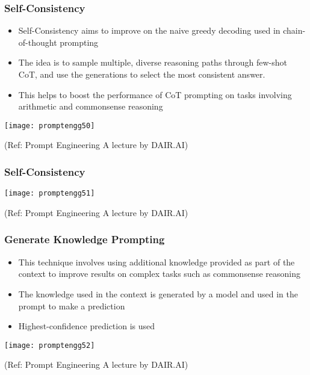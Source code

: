 \begin{frame}[fragile]\frametitle{Self-Consistency}

\begin{itemize}
\item Self-Consistency aims to improve on the naive greedy 
decoding used in chain-of-thought prompting 
\item The idea is to sample multiple, diverse reasoning paths 
through few-shot CoT, and use the generations to select 
the most consistent answer.  
\item  This helps to boost the performance of CoT prompting on 
tasks involving arithmetic and commonsense reasoning
\end{itemize}	

\begin{center}
\texttt{[image: promptengg50]}

{\tiny (Ref: Prompt Engineering A lecture by DAIR.AI)}

\end{center}	

\end{frame}


\begin{frame}[fragile]\frametitle{Self-Consistency}

\begin{center}
\texttt{[image: promptengg51]}

{\tiny (Ref: Prompt Engineering A lecture by DAIR.AI)}

\end{center}	

\end{frame}

\begin{frame}[fragile]\frametitle{Generate Knowledge Prompting}

\begin{itemize}
\item This technique involves using additional knowledge 
provided as part of the context to improve results on 
complex tasks such as commonsense reasoning 
\item The knowledge used in the context is generated by a 
model and used in the prompt to make a prediction 
\item Highest-confidence prediction is used
\end{itemize}	

\begin{center}
\texttt{[image: promptengg52]}

{\tiny (Ref: Prompt Engineering A lecture by DAIR.AI)}

\end{center}	

\end{frame}

